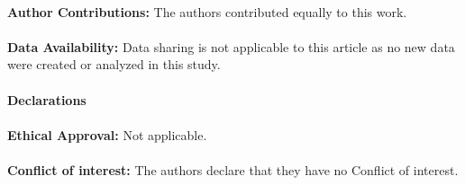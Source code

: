 \documentclass[10pt,reqno]{amsart}
\newcommand *\w{^\wedge}
\theoremstyle{definition}
\numberwithin{equation}{section}
\begin{document}
\ \\
 \textbf{Author Contributions:} The authors contributed equally to this work.\\
\ \\
\textbf{ Data Availability:} Data sharing is not applicable to this article as no new data were created or analyzed in this
 study.\\
 \ \\
 \textbf{Declarations}\\
 \ \\
\textbf{ Ethical Approval:} Not applicable.\\
\ \\
\textbf{Conflict of interest:} The authors declare that they have no Conflict of interest.
\end{document}
